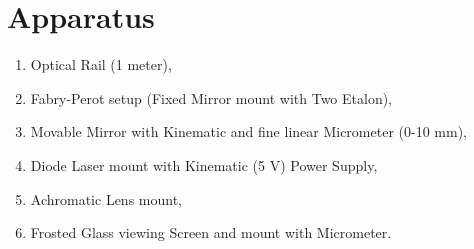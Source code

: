 \documentclass{article}
\begin{document}
\section{Apparatus}
\begin{enumerate}
    \item Optical Rail (1 meter),
    \item Fabry-Perot setup (Fixed Mirror mount with Two Etalon),
    \item Movable Mirror with Kinematic and fine linear Micrometer (0-10 mm),
    \item Diode Laser mount with Kinematic (5 V) Power Supply,
    \item Achromatic Lens mount,
    \item Frosted Glass viewing Screen and mount with Micrometer.
\end{enumerate}
\end{document}
